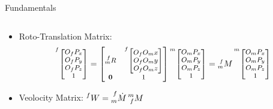 \begin{frame}{Fundamentals}
    \begin{columns}
        \begin{column}{0.5\textwidth}
            \begin{itemize}
                \item Roto-Translation Matrix: \begin{equation}
                    \begin{footnotesize}
                    \prescript{f}{}{\begin{bmatrix}
                      O_fP_x\\
                      O_fP_y\\
                      O_fP_z\\
                      1
                    \end{bmatrix}}=\begin{bmatrix}
                      \prescript{f}{m}{R}&\prescript{f}{}{\begin{bmatrix}
                        O_fO_mx\\
                        O_fO_my\\
                        O_fO_mz\\
                      \end{bmatrix}}\\
                      \mathbf{0}&1
                    \end{bmatrix}\prescript{m}{}{\begin{bmatrix}
                        O_mP_x\\
                        O_mP_y\\
                        O_mP_z\\
                        1
                      \end{bmatrix}}=\prescript{f}{m}{M}\prescript{m}{}{\begin{bmatrix}
                        O_mP_x\\
                        O_mP_y\\
                        O_mP_z\\
                        1
                      \end{bmatrix}}
                    \end{footnotesize}
                  \end{equation}
                \item Veolocity Matrix: $\prescript{f}{}{W}=\prescript{f}{m}{\dot{M}}\prescript{m}{f}{M}$\begin{equation}

\end{equation}
\end{itemize}
\end{column}
\end{columns}
\end{frame}
